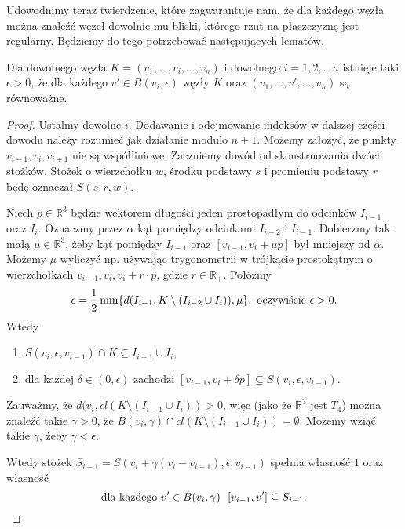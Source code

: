 Udowodnimy teraz twierdzenie, które zagwarantuje nam, że dla każdego węzła można znaleźć węzeł dowolnie mu bliski, którego rzut na płaszczyznę jest regularny.
Będziemy do tego potrzebować następujących lematów.
 
\begin{lemat}
\label{LEM1}
 Dla dowolnego węzła $K = (v_1, \ldots, v_i, \ldots, v_n)$ i dowolnego $i = 1,2,\ldots n$ istnieje taki $\epsilon > 0$, że dla każdego $v'\in B(v_i, \epsilon)$
 węzły $K$ oraz $(v_1, \ldots, v', \ldots, v_n)$ są równoważne.
\end{lemat}
\begin{proof}
 
Ustalmy dowolne $i$. Dodawanie i odejmowanie indeksów w dalszej części dowodu należy rozumieć jak działanie modulo $n+1$. Możemy założyć, że punkty $v_{i-1}, v_i, v_{i+1}$ nie są
współliniowe. Zaczniemy dowód od skonstruowania dwóch stożków.
Stożek o wierzchołku $w$, środku podstawy $s$ i promieniu podstawy $r$ będę oznaczał $S(s,r,w)$.
 
Niech $p\in\mathbb{R}^3$ będzie wektorem długości jeden prostopadłym do odcinków $I_{i-1}$ oraz $I_i$. Oznaczmy przez $\alpha$ kąt pomiędzy odcinkami
$I_{i-2}$ i $I_{i-1}$.
Dobierzmy tak małą $\mu\in\mathbb{R}^3$, żeby kąt pomiędzy $I_{i-1}$ oraz $[v_{i-1}, v_i + \mu p]$ był mniejszy od $\alpha$. Możemy $\mu$ wyliczyć np. używając trygonometrii
w trójkącie prostokątnym o wierzchołkach $v_{i-1}, v_i, v_i + r\cdot p$, gdzie $r\in\mathbb{R}_+$. Połóżmy
\begin{displaymath}
 \epsilon = \frac{1}{2}\min\lbrace d(I_{i-1}, K\setminus(I_{i-2}\cup I_i)), \mu\rbrace, \hbox{ oczywiście }\epsilon>0.
\end{displaymath}
Wtedy
\begin{enumerate}
 \item $S(v_i, \epsilon, v_{i-1})\cap K \subseteq I_{i-1}\cup I_i$,
 \item dla każdej $\delta\in(0,\epsilon)$ zachodzi $[v_{i-1}, v_i+\delta p]\subseteq S(v_i, \epsilon, v_{i-1})$.
\end{enumerate}
Zauważmy, że $d(v_i, cl(K\setminus(I_{i-1}\cup I_i)) > 0$, więc (jako że $\mathbb{R}^3$ jest $T_4$) można znaleźć takie
$\gamma > 0$, że $B(v_i,\gamma)\cap cl(K\setminus(I_{i-1}\cup I_i)) = \emptyset$. Możemy wziąć takie $\gamma$, żeby $\gamma < \epsilon$.
 
Wtedy stożek
$S_{i-1} = S(v_i + \gamma(v_i-v_{i-1}), \epsilon, v_{i-1})$ spełnia własność $1$ oraz własność
\begin{displaymath}
 \hbox{dla każdego }v'\in B(v_i, \gamma) \ \ [v_{i-1}, v']\subseteq S_{i-1}.
\end{displaymath}
 

\end{proof}
